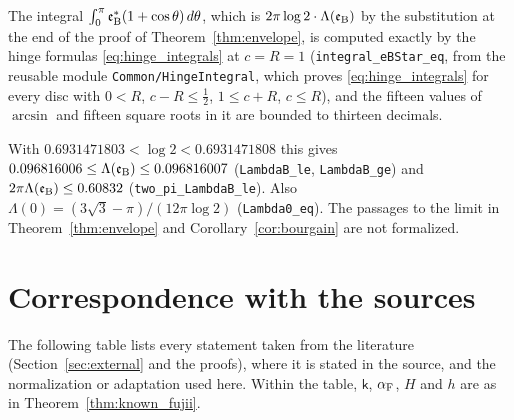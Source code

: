 \documentclass[11pt,a4paper]{article}
\makeatletter
\numberwithin{equation}{section}
\DeclareRobustCommand{\CGref}[1]{\ref{#1}}
\DeclareRobustCommand{\CGeqref}[1]{\eqref{#1}}
\let\CG@origref\ref
\let\CG@origeqref\eqref
\newcommand{\CG@gettip}[1]{\@ifundefined{CGTip@#1}{#1}{\csname CGTip@#1\endcsname}}
\DeclareRobustCommand{\CGref}[1]{\pdftooltip{\CG@origref{#1}}{\CG@gettip{#1}}}
\DeclareRobustCommand{\CGeqref}[1]{\pdftooltip{\CG@origeqref{#1}}{\CG@gettip{#1}}}
\theoremstyle{definition}
\theoremstyle{remark}
\newcommand{\eB}{\mathfrak e_{\rm B}}
\makeatother
\begin{document}
The integral $\int_0^\pi\eB^*(1+\cos\theta)\,d\theta$, which is $2\pi\log2\cdot\Lambda(\eB)$ by the substitution at the end of the proof of Theorem~\CGref{thm:envelope}, is computed exactly by the hinge formulas \CGeqref{eq:hinge_integrals} at $c=R=1$ (\texttt{integral\_eBStar\_eq}, from the reusable module \texttt{Common/HingeIntegral}, which proves \CGeqref{eq:hinge_integrals} for every disc with $0<R$, $c-R\le\frac12$, $1\le c+R$, $c\le R$), and the fifteen values of $\arcsin$ and fifteen square roots in it are bounded to thirteen decimals.

With $0.6931471803<\log2<0.6931471808$ this gives $0.096816006\le\Lambda(\eB)\le0.096816007$ (\texttt{LambdaB\_le}, \texttt{LambdaB\_ge}) and $2\pi\Lambda(\eB)\le0.60832$ (\texttt{two\_pi\_LambdaB\_le}). Also $\Lambda(0)=(3\sqrt3-\pi)/(12\pi\log2)$ (\texttt{Lambda0\_eq}). The passages to the limit in Theorem~\CGref{thm:envelope} and Corollary~\CGref{cor:bourgain} are not formalized.

\section{Correspondence with the sources}\label{app:sources}
The following table lists every statement taken from the literature (Section~\CGref{sec:external} and the proofs), where it is stated in the source, and the normalization or adaptation used here. Within the table, $\mathsf k$, $\alpha_{\rm F}$, $H$ and $h$ are as in Theorem~\CGref{thm:known_fujii}.
\end{document}
